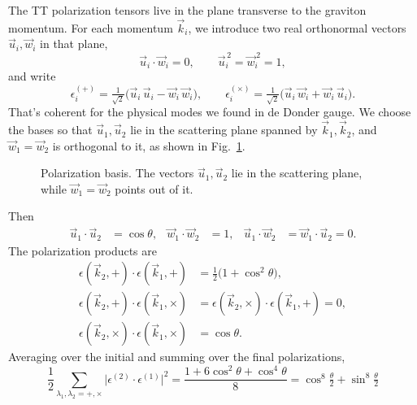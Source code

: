 \documentclass[12pt,a4paper,oneside]{article}
\numberwithin{equation}{section}   %
\begin{document}
The TT polarization tensors live in the plane transverse to the graviton
momentum. For each momentum $\vec k_i$,
we introduce two real orthonormal
vectors $\vec u_i,\vec w_i$ in that plane,
\[
\vec u_i\cdot\vec w_i=0,\qquad \vec u_i^{\,2}=\vec w_i^{\,2}=1,
\]
and write
\[
\epsilon^{(+)}_i=\tfrac{1}{\sqrt2}\bigl(\vec u_i\,\vec u_i-\vec w_i\,\vec w_i\bigr),
\qquad
\epsilon^{(\times)}_i=\tfrac{1}{\sqrt2}\bigl(\vec u_i\,\vec w_i+\vec w_i\,\vec u_i\bigr).
\]
That's coherent for the physical modes we found in de Donder gauge.
We choose the bases so that $\vec u_1,\vec u_2$ lie in the scattering plane
spanned by $\vec k_1,\vec k_2$, and $\vec w_1=\vec w_2$ is orthogonal to it,
as shown in Fig.~\ref{fig:pol-basis}.
\begin{figure}[H]
\centering
{}
\caption{Polarization basis. The vectors $\vec u_1,\vec u_2$ lie in the scattering
plane, while $\vec w_1=\vec w_2$ points out of it.}
\label{fig:pol-basis}
\end{figure}
Then
\begin{align}
\vec u_1\cdot\vec u_2&=\cos\theta, &
\vec w_1\cdot\vec w_2&=1, &
\vec u_1\cdot\vec w_2&=\vec w_1\cdot\vec u_2=0 .
\end{align}
The polarization products are
\begin{align}
\epsilon(\vec k_2,+)\cdot\epsilon(\vec k_1,+)&=\tfrac12\bigl(1+\cos^2\theta\bigr),\\
\epsilon(\vec k_2,+)\cdot\epsilon(\vec k_1,\times)&=\epsilon(\vec k_2,\times)\cdot\epsilon(\vec k_1,+)=0,\\
\epsilon(\vec k_2,\times)\cdot\epsilon(\vec k_1,\times)&=\cos\theta .
\end{align}
Averaging over the initial and summing over the final polarizations,
\begin{equation}
    \boxed{
\frac12\sum_{\lambda_1,\lambda_2=+,\times}
\bigl|\epsilon^{(2)}\!\cdot\epsilon^{(1)}\bigr|^2
=\frac{1+6\cos^2\theta+\cos^4\theta}{8}
=\cos^8\tfrac\theta2+\sin^8\tfrac\theta2}
\label{eq:polsum}
\end{equation}
\end{document}
